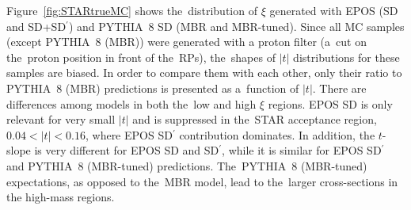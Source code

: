 Figure~\ref{fig:STARtrueMC} shows the~distribution of $\xi$ generated with  EPOS (SD and SD+SD$^\prime$) and PYTHIA~8 SD (MBR and MBR-tuned). Since all MC samples (except PYTHIA~8 (MBR)) were generated  with a proton filter
(a~cut on the~proton position  in front of the~RPs),  the~shapes of $|t|$ distributions for these samples are biased. In order to compare them with each other, only their ratio to PYTHIA~8 (MBR) predictions is presented as a~function of $|t|$.
There are differences among models in both the~low and high $\xi$ regions. %
EPOS SD is only relevant for very small $|t|$ and is suppressed in the~STAR acceptance region, $0.04<|t|<0.16$, where EPOS SD$^\prime$ contribution dominates. In addition, the $t$-slope is  very different for EPOS SD and SD$^\prime$, while it is similar for EPOS SD$^\prime$ and PYTHIA~8 (MBR-tuned) predictions. The~PYTHIA~8 (MBR-tuned) expectations, as opposed to the~MBR model,  lead
to the~larger cross-sections in the high-mass regions.
